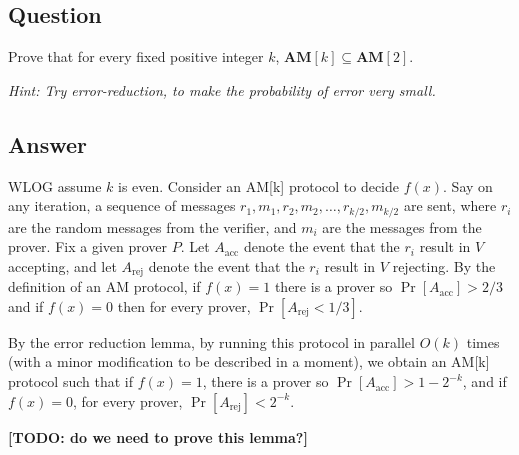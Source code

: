 \documentclass{article}
\newcommand{\AM}{\mathbf{AM}}
\begin{document}
\subsection*{Question}
Prove that for every fixed positive integer $k$, $\AM[k]\subseteq \AM[2]$.

\medskip

\emph{Hint: Try error-reduction, to make the probability of error very small.}


\subsection*{Answer}

WLOG assume $k$ is even. Consider an AM[k] protocol to decide $f(x)$.  Say on any iteration, a sequence of messages $r_1, m_1, r_2, m_2, \dots, r_{k/2}, m_{k/2}$ are sent, where $r_i$ are the random messages from the verifier, and $m_i$ are the messages from the prover.
Fix a given prover $P$.  Let $A_\text{acc}$ denote the event that the $r_i$ result in $V$ accepting, and let $A_\text{rej}$ denote the event that the $r_i$ result in $V$ rejecting.
By the definition of an AM protocol, if $f(x) = 1$ there is a prover so $\Pr[A_\text{acc}] > 2/3$ and if $f(x) = 0$ then for every prover, $\Pr[A_\text{rej} < 1/3]$.

By the error reduction lemma, by running this protocol in parallel $O(k)$ times (with a minor modification to be described in a moment), we obtain an AM[k] protocol such that if $f(x) = 1$, there is a prover so $\Pr[A_\text{acc}] > 1 - 2^{-k}$, and if $f(x) = 0$, for every prover, $\Pr[A_\text{rej}] < 2^{-k}$.

\textbf{[TODO: do we need to prove this lemma?]}
\end{document}
